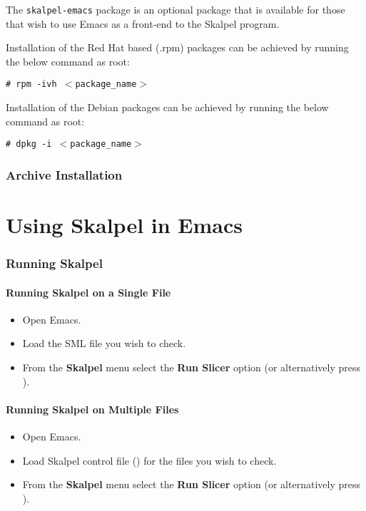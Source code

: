 \documentclass{report}
\begin{document}
The \texttt{skalpel-emacs} package is an optional package that is
available for those that wish to use Emacs as a front-end to the
Skalpel program.

Installation of the Red Hat based (.rpm) packages can be achieved by
running the below command as root:

\texttt{\# rpm -ivh $<$package\_name$>$}

Installation of the Debian packages can be achieved by running the
below command as root:

\texttt{\# dpkg -i $<$package\_name$>$}

\subsection {Archive Installation}
\label{archive-installation}

\chapter{Using Skalpel in Emacs}

\subsection{Running Skalpel}


\subsubsection{Running Skalpel on a Single File}

\begin{itemize}
\item Open Emacs.
\item Load the SML file you wish to check.
\item From the \textbf{Skalpel} menu select the \textbf{Run Slicer}
  option (or alternatively press ).
\end{itemize}

\subsubsection{Running Skalpel on Multiple Files}

\begin{itemize}
\item Open Emacs.
\item Load Skalpel control file () for
  the files you wish to check.

\item From the \textbf{Skalpel} menu select the \textbf{Run Slicer}
  option (or alternatively press ).
\end{itemize}
\end{document}
